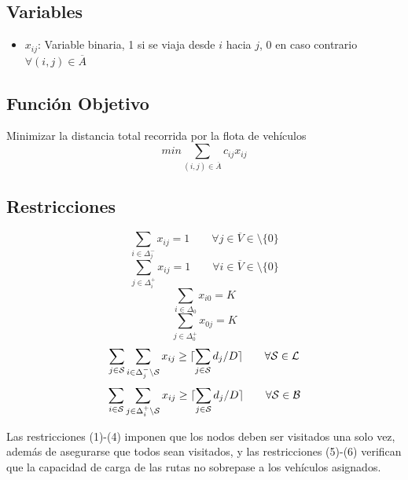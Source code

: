 \documentclass[letter, 10pt]{article}
\begin{document}
\subsection*{Variables}
\begin{itemize}
    \item $x_{ij}$: Variable binaria, 1 si se viaja desde $i$ hacia $j$, 0 en caso contrario $\forall (i, j) \in \overline{A}$
\end{itemize}

\subsection*{Función Objetivo}
Minimizar la distancia total recorrida por la flota de vehículos
$$ min \sum_{(i, j) \in \overline{A}} c_{ij} x_{ij} $$

\subsection*{Restricciones}

\begin{equation} 
 \sum_{i \in \Delta_j^-} x_{ij} = 1 \qquad \forall j \in \overline{V} \in \setminus \{0\}
\end{equation}
\begin{equation} 
 \sum_{j \in \Delta_i^+} x_{ij} = 1 \qquad \forall i \in \overline{V} \in \setminus \{0\}
\end{equation}
\begin{equation} 
 \sum_{i \in \Delta_0} x_{i0} = K
\end{equation}
\begin{equation} 
 \sum_{j \in \Delta_0^+} x_{0j} = K
\end{equation}
\begin{equation} 
 \sum_{j \in \CMcal{S}} \sum_{i \in \Delta_j^- \setminus \CMcal{S}} x_{ij} \geq \lceil \sum_{j \in \CMcal{S}} d_j / D \rceil \qquad \forall \CMcal{S} \in \CMcal{L}
\end{equation}
\begin{equation} 
 \sum_{i \in \CMcal{S}} \sum_{j \in \Delta_i^+ \setminus \CMcal{S}} x_{ij} \geq \lceil \sum_{j \in \CMcal{S}} d_j / D \rceil \qquad \forall \CMcal{S} \in \CMcal{B}
\end{equation}

Las restricciones (1)-(4) imponen que los nodos deben ser visitados una solo vez, además de asegurarse que todos sean visitados, y las restricciones (5)-(6) verifican que la capacidad de carga de las rutas no sobrepase a los vehículos asignados.
\end{document}
